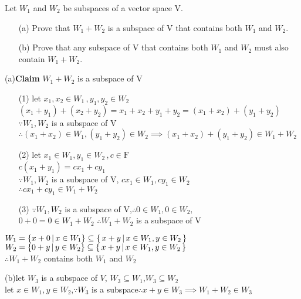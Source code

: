 Let $W_1$ and $W_2$ be subspaces of a vector space $\mathrm{V}$.

\begin{enumerate}
	\item[(a)] Prove that $W_1 + W_2$ is a subspace of $\mathrm{V}$ that contains both $W_1$ and $W_2$. 
	\item[(b)] Prove that any subspace of $\mathrm{V}$ that contains both $W_1$ and $W_2$ must also contain $W_1 + W_2$.
\end{enumerate}

\begin{tcolorbox}
	\begin{solution}
		$ $\\
		(a)\textbf{Claim} $W_1+W_2$ is a subspace of V
		\begin{enumerate}
			\item[(1)] let $x_1,x_2 \in W_1$\,,\,$y_1,y_2 \in W_2$\\
			$(x_1+y_1)+(x_2+y_2) = x_1 +x_2 + y_1+ y_2 = (x_1 +x_2) + (y_1+ y_2)$\\
			$\because W_1,W_2$ is a subspace of V\\
			$\therefore (x_1+x_2) \in W_1 , (y_1+y_2) \in W_2 \implies (x_1 + x_2)+(y_1+y_2) \in W_1 + W_2$
			\item[(2)] let $x_1 \in W_1 , y_1 \in W_2$\,,\,$c \in \mathrm{F}$\\
			$c(x_1+y_1) = cx_1+cy_1$\\
			$\because W_1,W_2$ is a subspace of V, $cx_1 \in W_1, cy_1 \in W_2 $\\
			$\therefore cx_1+cy_1 \in W_1 + W_2$
			\item[(3)] $\because W_1, W_2$ is a subspace of V,$\therefore 0\in W_1, 0 \in W_2,$\\
			$0+0 = 0 \in W_1 + W_2$
			$\therefore W_1+W_2$ is a subspace of V
		\end{enumerate}
		
		$W_1 = \{x+0 \,|\, x \in W_1\} \subseteq \left\{ \,x+y \,|\, x \in W_1 , y \in W_2 \,\right\}$\\
		$W_2 = \{0+y \,|\, y \in W_2\} \subseteq \left\{ \,x+y \,|\, x \in W_1 , y \in W_2 \,\right\}$\\
		$\therefore W_1 + W_2$ contains both $W_1$ and $W_2$
		
		(b)let $W_3$ is a subspace of $V$,
		$W_3 \subseteq W_1$,$W_3 \subseteq W_2$\\
		
		let $x \in W_1, y \in W_2$,$\because W_3$ is a subspace$\therefore x+y \in W_3 \implies W_1 + W_2 \in W_3$
	\end{solution}	
\end{tcolorbox}

